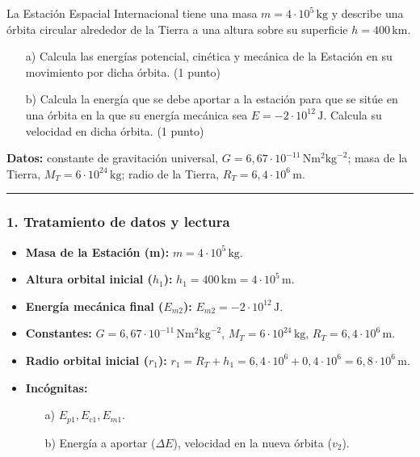 \begin{cajaenunciado}
La Estación Espacial Internacional tiene una masa $m=4\cdot10^5\,\text{kg}$ y describe una órbita circular alrededor de la Tierra a una altura sobre su superficie $h=400\,\text{km}$.
\begin{enumerate}
    \item[a)] Calcula las energías potencial, cinética y mecánica de la Estación en su movimiento por dicha órbita. (1 punto)
    \item[b)] Calcula la energía que se debe aportar a la estación para que se sitúe en una órbita en la que su energía mecánica sea $E=-2\cdot10^{12}\,\text{J}$. Calcula su velocidad en dicha órbita. (1 punto)
\end{enumerate}
\textbf{Datos:} constante de gravitación universal, $G=6,67\cdot10^{-11}\,\text{N}\text{m}^2\text{kg}^{-2}$; masa de la Tierra, $M_T=6\cdot10^{24}\,\text{kg}$; radio de la Tierra, $R_T=6,4\cdot10^6\,\text{m}$.
\end{cajaenunciado}
\hrule

\subsubsection*{1. Tratamiento de datos y lectura}
\begin{itemize}
    \item \textbf{Masa de la Estación (m):} $m = 4 \cdot 10^5 \, \text{kg}$.
    \item \textbf{Altura orbital inicial ($h_1$):} $h_1 = 400 \, \text{km} = 4 \cdot 10^5 \, \text{m}$.
    \item \textbf{Energía mecánica final ($E_{m2}$):} $E_{m2} = -2 \cdot 10^{12} \, \text{J}$.
    \item \textbf{Constantes:} $G = 6,67 \cdot 10^{-11} \, \text{N}\text{m}^2\text{kg}^{-2}$, $M_T = 6 \cdot 10^{24} \, \text{kg}$, $R_T = 6,4 \cdot 10^6 \, \text{m}$.
    \item \textbf{Radio orbital inicial ($r_1$):} $r_1 = R_T + h_1 = 6,4 \cdot 10^6 + 0,4 \cdot 10^6 = 6,8 \cdot 10^6 \, \text{m}$.
    \item \textbf{Incógnitas:}
    \begin{itemize}
        \item[a)] $E_{p1}, E_{c1}, E_{m1}$.
        \item[b)] Energía a aportar ($\Delta E$), velocidad en la nueva órbita ($v_2$).
    \end{itemize}
\end{itemize}

